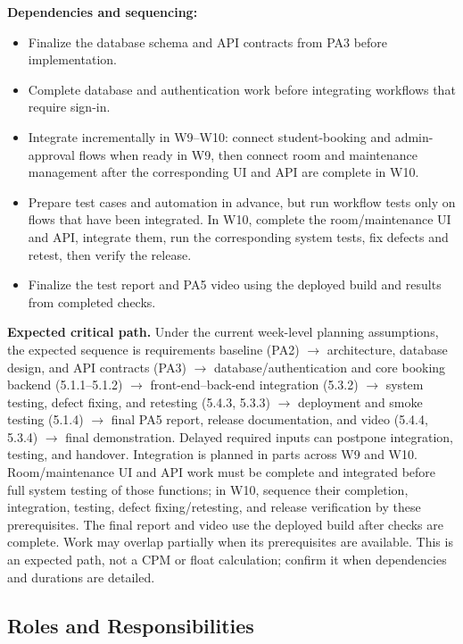 \medskip
\noindent\textbf{Dependencies and sequencing:}
\begin{itemize}[leftmargin=*,itemsep=2pt]
  \item Finalize the database schema and API contracts from PA3 before implementation.
  \item Complete database and authentication work before integrating workflows that require sign-in.
  \item Integrate incrementally in W9--W10: connect student-booking and admin-approval flows when ready in W9, then connect room and maintenance management after the corresponding UI and API are complete in W10.
  \item Prepare test cases and automation in advance, but run workflow tests only on flows that have been integrated. In W10, complete the room/maintenance UI and API, integrate them, run the corresponding system tests, fix defects and retest, then verify the release.
  \item Finalize the test report and PA5 video using the deployed build and results from completed checks.
\end{itemize}
\textbf{Expected critical path.} Under the current week-level planning
assumptions, the expected sequence is requirements baseline (PA2)
$\rightarrow$ architecture, database design, and API contracts (PA3)
$\rightarrow$ database/authentication and core booking backend (5.1.1--5.1.2)
$\rightarrow$ front-end--back-end integration (5.3.2)
$\rightarrow$ system testing, defect fixing, and retesting (5.4.3, 5.3.3)
$\rightarrow$ deployment and smoke testing (5.1.4)
$\rightarrow$ final PA5 report, release documentation, and video (5.4.4, 5.3.4)
$\rightarrow$ final demonstration. Delayed required inputs can postpone
integration, testing, and handover. Integration is planned in parts across W9
and W10. Room/maintenance UI and API work must be complete and integrated before
full system testing of those functions; in W10, sequence their completion,
integration, testing, defect fixing/retesting, and release verification by these
prerequisites. The final report and video use the deployed build after checks
are complete. Work may overlap partially when its prerequisites are available.
This is an expected path, not a CPM or float calculation; confirm it when
dependencies and durations are detailed.

\subsection{Roles and Responsibilities}


